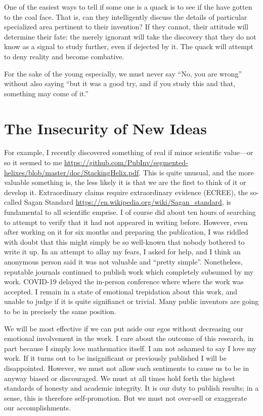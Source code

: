 \documentclass[
	fontsize=10pt, %
	twoside=false, %
	secnumdepth=1, %
]{kaobook}
\begin{document}
One of the easiest ways to tell if some one is a quack is
to see if the have gotten to the coal face.
That is, can they intelligently discuss the details
of particular specialized area pertinent to their invention?
If they cannot, their attitude will determine their fate:
the merely ignorant will take the discovery that they
do not know as a signal to study further, even if dejected by it.
The quack will attempt to deny reality and become combative.

For the sake of the young especially, we must never say
``No, you are wrong'' without also saying ``but it was
a good try, and if you study this and that, something may come of it.''


\section{The Insecurity of New Ideas}

For example, I recently discovered something of
real if minor scientific value---or so it seemed to me \url{https://github.com/PubInv/segmented-helixes/blob/master/doc/StackingHelix.pdf}.
This is quite unusual, and the more valuable something is,
the less likely it is that we are the first to think of it
or develop it.
Extraordinary claims require extraordinary evidence (ECREE),
the so-called Sagan Standard \url{https://en.wikipedia.org/wiki/Sagan_standard},
is fundamental to all scientific emprise.
I of course did about ten hours of searching to
attempt to verify that it had not appeared in writing before.
However, even after working on it for six months and preparing
the publication, I was riddled with doubt that this might simply
be so well-known that nobody bothered to write it up.
In an attempt to allay my fears, I asked for help, and
I think an anonymous person said it was not valuable and ``pretty simple''.
Nonetheless, reputable journals continued to publish work
which completely subsumed by my work. COVID-19 delayed the
in-person conference where where the work was accepted.
I remain in a state of emotional trepidation about this work,
and unable to judge if it is quite signifianct or trivial.
Many public inventors are going to be in precisely the
same position.

We will be most effective if we can put aside our egos
without decreasing our emotional involvement in the work.
I care about the outcome of this research, in part because
I simply love mathematics itself.
I am not ashamed to say I love my work. If it turns out
to be insignificant or previously published I will be disappointed.
However, we must not allow such sentiments to cause
us to be in anyway biased or discouraged.
We must at all times hold forth the highest standards
of honesty and academic integrity.
It is our duty to publish results; in a sense,
this is therefore self-promotion.
But we must not over-sell or exaggerate our accomplishments.
\end{document}
